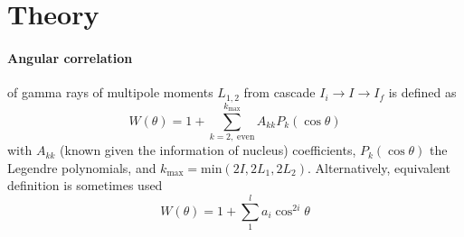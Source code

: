 \section{Theory}

\paragraph{Angular correlation} of gamma rays of multipole moments $L_{1,2}$ from \gag cascade $I_i \rightarrow I \rightarrow I_f$ is defined as
\begin{equation}
   W(\theta) = 1 + \sum_{k=2, \; \text{even}}^{k_\text{max}} A_{kk} P_k (\cos \theta)
\end{equation}
with $A_{kk}$ (known given the information of nucleus) coefficients, $P_k (\cos \theta)$ the Legendre polynomials, and $k_\text{max} = \text{min}(2I, 2L_1, 2L_2)$\cite{siegbahn}. Alternatively, equivalent definition is sometimes used~\cite{deutsch}
\begin{equation}
   W(\theta) = 1 + \sum_{1}^{l} a_i \cos^{2i} \theta
\end{equation}

